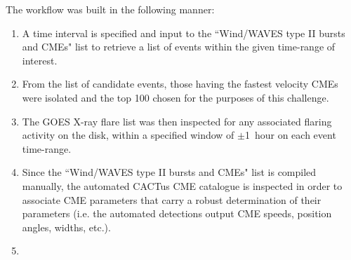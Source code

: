 \documentclass[namedreferences]{SolarPhysics}
\begin{document}
\begin{article}
The workflow was built in the following manner:

\begin{enumerate}

\item A time interval is specified and input to the ``Wind/WAVES type II bursts and CMEs" list to retrieve a list of events within the given time-range of interest.

\item From the list of candidate events, those having the fastest velocity CMEs were isolated and the top 100 chosen for the purposes of this challenge.

\item The GOES X-ray flare list was then inspected for any associated flaring activity on the disk, within a specified window of $\pm$1~hour on each event time-range.

\item Since the ``Wind/WAVES type II bursts and CMEs" list is compiled manually, the automated CACTus CME catalogue is inspected in order to associate CME parameters that carry a robust determination of their parameters (i.e. the automated detections output CME speeds, position angles, widths, etc.).

\item

\end{enumerate}





%



%
  

%



%
%


%
%
%
  
%
%
%   
%  

\end{article} 
\end{document}
